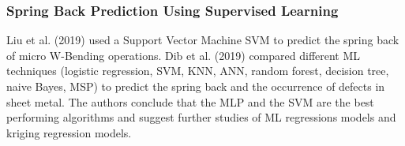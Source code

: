 \subsubsection*{Spring Back Prediction Using Supervised Learning}
Liu et al. (2019) used a Support Vector Machine \ac{SVM} to predict the spring back of micro W-Bending operations. \cite{liu_springbackpredictionforming_2019} 
Dib et al. (2019) compared different \ac{ML} techniques (logistic regression, SVM, KNN, ANN, random forest, decision tree, naive Bayes, MSP) to predict the spring back and the occurrence of defects in sheet metal. \cite[p. 1]{dib_singleensembleclassifiers_2020}
The authors conclude that the MLP and the SVM are the best performing algorithms and suggest further studies of ML regressions models and kriging regression models. \cite[p. 13]{dib_singleensembleclassifiers_2020}

